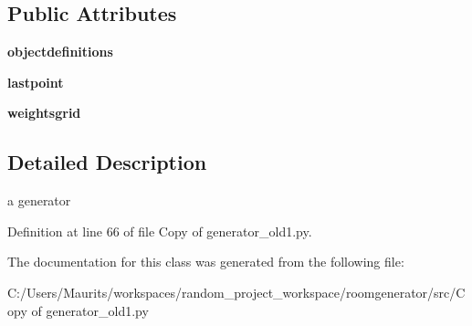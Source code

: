 \subsection*{Public Attributes}
\begin{DoxyCompactItemize}
\item 
\hypertarget{class_copy_01of_01generator__old1_1_1_generator_a81e1d6b888a7324b7ea603d9a3b1a33b}{}{\bfseries objectdefinitions}\label{class_copy_01of_01generator__old1_1_1_generator_a81e1d6b888a7324b7ea603d9a3b1a33b}

\item 
\hypertarget{class_copy_01of_01generator__old1_1_1_generator_a9d2a6cb9e7aabd50864cf8598842800c}{}{\bfseries lastpoint}\label{class_copy_01of_01generator__old1_1_1_generator_a9d2a6cb9e7aabd50864cf8598842800c}

\item 
\hypertarget{class_copy_01of_01generator__old1_1_1_generator_a56cd405a66fd94062e8a739eef745fc1}{}{\bfseries weightsgrid}\label{class_copy_01of_01generator__old1_1_1_generator_a56cd405a66fd94062e8a739eef745fc1}

\end{DoxyCompactItemize}


\subsection{Detailed Description}
\begin{DoxyVerb}a generator
\end{DoxyVerb}
 

Definition at line 66 of file Copy of generator\+\_\+old1.\+py.



The documentation for this class was generated from the following file\+:\begin{DoxyCompactItemize}
\item 
C\+:/\+Users/\+Maurits/workspaces/random\+\_\+project\+\_\+workspace/roomgenerator/src/Copy of generator\+\_\+old1.\+py\end{DoxyCompactItemize}
